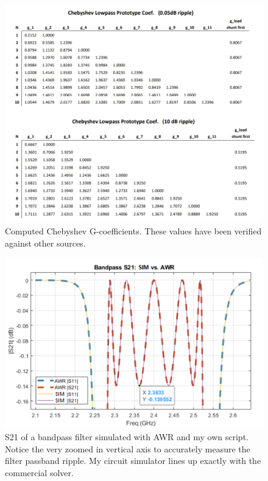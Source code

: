 \documentclass[10pt,conference]{IEEEtran}
\begin{document}
\begin{figure}
	\centering
	\includegraphics[width=0.9\linewidth]{Figures/Chebyshev_G_coefs.png}
	\caption{Computed Chebyshev G-coefficients. These values have been verified against other sources.}
	\label{Chebyshev_G_coefs}
\end{figure}


\begin{figure}
	\centering
	\includegraphics[width=0.9\linewidth]{Figures/MATLAB_vs_AWR_2.png}
	\caption{S21 of a bandpass filter simulated with AWR and my own script. Notice the very zoomed in vertical axis to accurately measure the filter passband ripple. My circuit simulator lines up exactly with the commercial solver.}
	\label{MATLAB_vs_AWR_2}
\end{figure}



\end{document}
